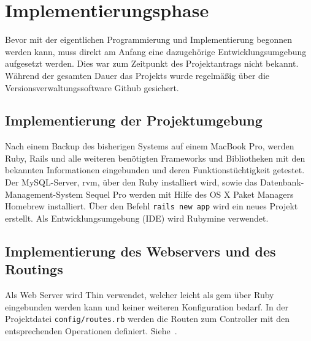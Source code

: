 \section{Implementierungsphase} 
\label{sec:Implementierungsphase}
Bevor mit der eigentlichen Programmierung und Implementierung begonnen werden kann, muss direkt am Anfang eine dazugehörige Entwicklungsumgebung aufgesetzt werden. Dies war zum Zeitpunkt des Projektantrags nicht bekannt. 
Während der gesamten Dauer das Projekts wurde regelmäßig über die Versionsverwaltungssoftware Github gesichert.

\subsection{Implementierung der Projektumgebung}
\label{subsec:ImplementierungDatenstruktur}
Nach einem Backup des bisherigen Systems auf einem MacBook Pro, werden \acs{Ruby}, \acs{Rails} und alle weiteren benötigten \acs{Framework}s und Bibliotheken mit den bekannten Informationen eingebunden und deren Funktionstüchtigkeit getestet. Der \acs{MySQL}-Server, \ac{rvm}, über den \acs{Ruby} installiert wird, sowie das Datenbank-Management-System Sequel Pro werden mit Hilfe des OS X Paket Managers Homebrew installiert. Über den Befehl \texttt{rails new app} wird ein neues Projekt erstellt. Als Entwicklungsumgebung (\acs{IDE}) wird Rubymine verwendet.


\subsection{Implementierung des Webservers und des Routings}
\label{subsec:ImplementierungBenutzeroberfläche}
Als Web Server wird Thin verwendet, welcher leicht als \acs{gem} über \acs{Ruby} eingebunden werden kann und keiner weiteren Konfiguration bedarf. In der Projektdatei \texttt{config/routes.rb} werden die Routen zum Controller mit den entsprechenden Operationen definiert. Siehe~.


